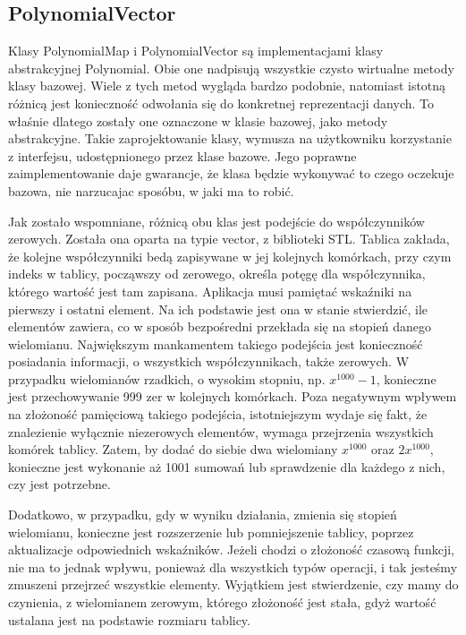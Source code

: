 \documentclass[twoside,a4paper]{book}
\begin{document}
\subsection{PolynomialVector}

Klasy PolynomialMap i PolynomialVector są implementacjami klasy abstrakcyjnej Polynomial. Obie one nadpisują wszystkie czysto wirtualne metody klasy bazowej. Wiele z tych metod wygląda bardzo podobnie, natomiast istotną różnicą jest konieczność odwołania się do konkretnej reprezentacji danych. To właśnie dlatego zostały one oznaczone w klasie bazowej, jako metody abstrakcyjne. Takie zaprojektowanie klasy, wymusza na użytkowniku korzystanie z interfejsu, udostępnionego przez klase bazowe. Jego poprawne zaimplementowanie daje gwarancje, że klasa będzie wykonywać to czego oczekuje bazowa, nie narzucajac sposóbu, w jaki ma to robić.

Jak zostało wspomniane, różnicą obu klas jest podejście do współczynników zerowych. Została ona oparta na typie vector, z biblioteki STL. Tablica zakłada, że kolejne współczynniki bedą zapisywane w jej kolejnych komórkach, przy czym indeks w tablicy, począwszy od zerowego, określa potęgę dla współczynnika, którego wartość jest tam zapisana. Aplikacja musi pamiętać wskaźniki na pierwszy i ostatni element. Na ich podstawie jest ona w stanie stwierdzić, ile elementów zawiera, co w sposób bezpośredni przekłada się na stopień danego wielomianu. Największym mankamentem takiego podejścia jest konieczność posiadania informacji, o wszystkich współczynnikach, także zerowych. W przypadku wielomianów rzadkich, o wysokim stopniu, np. $x^{1000}-1$, konieczne jest przechowywanie 999 zer w kolejnych komórkach. Poza negatywnym wpływem na złożoność pamięciową takiego podejścia, istotniejszym wydaje się fakt, że znalezienie wyłącznie niezerowych elementów, wymaga przejrzenia wszystkich komórek tablicy. Zatem, by dodać do siebie dwa wielomiany $x^{1000}$ oraz $2x^{1000}$, konieczne jest wykonanie aż 1001 sumowań lub sprawdzenie dla każdego z nich, czy jest potrzebne.

Dodatkowo, w przypadku, gdy w wyniku działania, zmienia się stopień wielomianu, konieczne jest rozszerzenie lub pomniejszenie tablicy, poprzez aktualizacje odpowiednich wskaźników. Jeżeli chodzi o złożoność czasową funkcji, nie ma to jednak wpływu, ponieważ dla wszystkich typów operacji, i tak jesteśmy zmuszeni przejrzeć wszystkie elementy. Wyjątkiem jest stwierdzenie, czy mamy do czynienia, z wielomianem zerowym, którego złożoność jest stała, gdyż wartość ustalana jest na podstawie rozmiaru tablicy.
\end{document}
